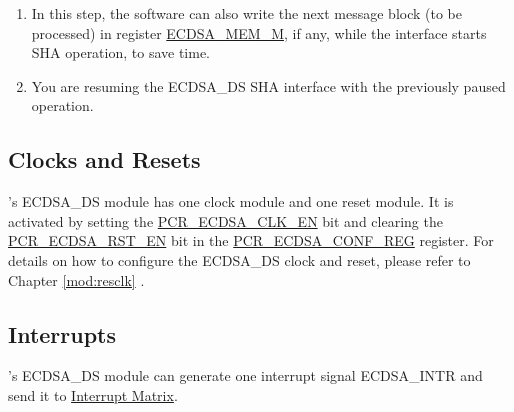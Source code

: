 \documentclass[main\_\_EN.tex]{subfiles}
\begin{document}
\begin{tiplisting}\label{others:ecdsa-note-sha}
\vspace{-2.5em}
\begin{enumerate}
\item In this step, the software can also write the next message block (to be processed) in register \hyperref[tab:ecdsa-memory]{ECDSA\_MEM\_M}, if any, while the interface starts SHA operation, to save time.
\item You are resuming the ECDSA\_DS SHA interface with the previously paused operation.
\end{enumerate}
\end{tiplisting}

\clearpage
\subsection{Clocks and Resets}

\chipname{}'s ECDSA\_DS module has one clock module and one reset module. It is activated by setting the \hyperref[fielddesc:PCRECDSACLKEN]{PCR\_ECDSA\_CLK\_EN} bit and clearing the \hyperref[fielddesc:PCRECDSARSTEN]{PCR\_ECDSA\_RST\_EN} bit in the \hyperref[regdesc:PCRECDSACONFREG]{PCR\_ECDSA\_CONF\_REG} register. For details on how to configure the ECDSA\_DS clock and reset, please refer to Chapter \ref{mod:resclk} \textit{}.

\subsection{Interrupts}
\label{sec:eccda-interrupt}

\chipname{}'s ECDSA\_DS module can generate one interrupt signal ECDSA\_INTR and send it to \hyperref[mod:intmtrx]{Interrupt Matrix}.
\end{document}
